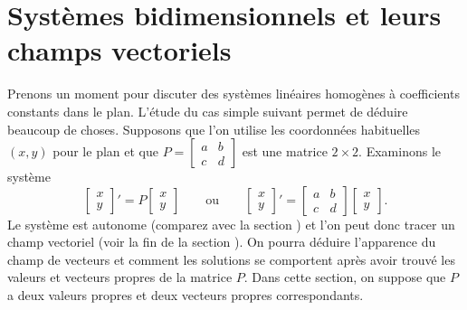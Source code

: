 
\sectionnewpage
\section{Systèmes bidimensionnels et leurs champs vectoriels}
\label{sec:twodimaut}


Prenons un moment pour discuter des systèmes linéaires homogènes à coefficients constants dans le plan. L’étude du cas simple suivant permet de déduire beaucoup de choses. Supposons que l’on utilise les coordonnées habituelles $(x,y)$ pour le plan et que
$P = \left[ \begin{smallmatrix} a & b \\ c & d \end{smallmatrix} \right]$ 
est une matrice $2 \times 2$.  Examinons le système
\begin{equation} \label{pln:eq}
\begin{bmatrix} x \\ y \end{bmatrix} ' =
P \begin{bmatrix} x \\ y \end{bmatrix} 
\qquad 
\text{ou}
\qquad
\begin{bmatrix} x \\ y \end{bmatrix} ' =
\begin{bmatrix} a & b \\ c & d \end{bmatrix} 
\begin{bmatrix} x \\ y \end{bmatrix} 
.
\end{equation}
Le système est autonome (comparez avec la section )
et l'on peut donc tracer un champ vectoriel (voir la fin de la section
).
On pourra déduire l’apparence du champ de vecteurs et comment les solutions se comportent après avoir trouvé les valeurs et vecteurs propres de la matrice $P$.
Dans cette section, on suppose que $P$ a deux valeurs propres et deux vecteurs propres correspondants.

\medskip

